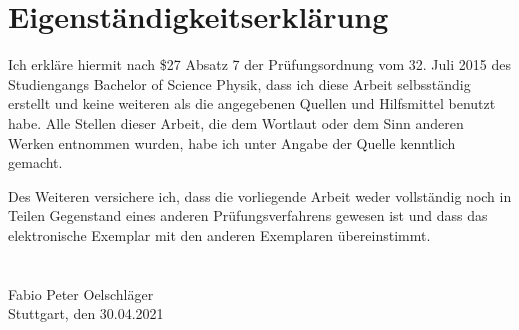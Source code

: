 \chapter{Eigenständigkeitserklärung}
Ich erkläre hiermit nach \$27 Absatz 7 der Prüfungsordnung vom 32. Juli 2015 des Studiengangs
Bachelor of Science Physik, dass ich diese Arbeit selbsständig erstellt und keine weiteren als die
angegebenen Quellen und Hilfsmittel benutzt habe. Alle Stellen dieser Arbeit, die dem Wortlaut
oder dem Sinn anderen Werken entnommen wurden, habe ich unter Angabe der Quelle kenntlich gemacht.

Des Weiteren versichere ich, dass die vorliegende Arbeit weder vollständig noch in Teilen
Gegenstand eines anderen Prüfungsverfahrens gewesen ist und dass das elektronische Exemplar mit
den anderen Exemplaren übereinstimmt.
\\
\\
\\
Fabio Peter Oelschläger\\
Stuttgart, den 30.04.2021
